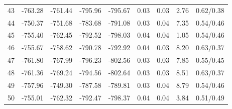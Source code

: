 \begin{tabular}{lrrrrrrrr}
43 & -763.28 & -761.44 & -795.96 & -795.67 & 0.03 & 0.03 & 2.76 & 0.62/0.38 \\
44 & -750.37 & -751.68 & -783.68 & -791.08 & 0.03 & 0.04 & 7.35 & 0.54/0.46 \\
45 & -755.40 & -762.45 & -792.52 & -798.03 & 0.04 & 0.04 & 1.05 & 0.54/0.46 \\
46 & -755.67 & -758.62 & -790.78 & -792.92 & 0.04 & 0.03 & 8.20 & 0.63/0.37 \\
47 & -761.80 & -767.99 & -796.23 & -802.56 & 0.03 & 0.03 & 7.85 & 0.55/0.45 \\
48 & -761.36 & -769.24 & -794.56 & -802.64 & 0.03 & 0.03 & 8.51 & 0.63/0.37 \\
49 & -757.96 & -749.30 & -787.58 & -789.81 & 0.03 & 0.04 & 8.79 & 0.54/0.46 \\
50 & -755.01 & -762.32 & -792.47 & -798.37 & 0.04 & 0.04 & 3.84 & 0.51/0.49 \\
\hline
\end{tabular}
